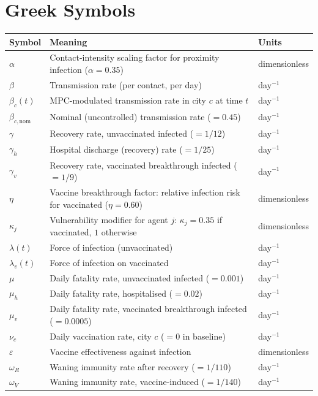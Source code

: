 \bigskip
\section*{Greek Symbols}

\begin{tabular}{@{}lll@{}}
\toprule
\textbf{Symbol} & \textbf{Meaning} & \textbf{Units} \\
\midrule
$\alpha$    & Contact-intensity scaling factor for proximity infection ($\alpha=0.35$) & dimensionless \\
$\beta$     & Transmission rate (per contact, per day)                         & day$^{-1}$ \\
$\beta_c(t)$& MPC-modulated transmission rate in city $c$ at time $t$          & day$^{-1}$ \\
$\beta_{c,\mathrm{nom}}$ & Nominal (uncontrolled) transmission rate ($=0.45$) & day$^{-1}$ \\
$\gamma$    & Recovery rate, unvaccinated infected ($=1/12$)                   & day$^{-1}$ \\
$\gamma_h$  & Hospital discharge (recovery) rate ($=1/25$)                      & day$^{-1}$ \\
$\gamma_v$  & Recovery rate, vaccinated breakthrough infected ($=1/9$)         & day$^{-1}$ \\
$\eta$      & Vaccine breakthrough factor: relative infection risk for vaccinated ($\eta=0.60$) & dimensionless \\
$\kappa_j$ & Vulnerability modifier for agent $j$: $\kappa_j=0.35$ if vaccinated, $1$ otherwise & dimensionless \\
$\lambda(t)$& Force of infection (unvaccinated)                                & day$^{-1}$ \\
$\lambda_v(t)$ & Force of infection on vaccinated                              & day$^{-1}$ \\
$\mu$       & Daily fatality rate, unvaccinated infected ($=0.001$)            & day$^{-1}$ \\
$\mu_h$     & Daily fatality rate, hospitalised ($=0.02$)                       & day$^{-1}$ \\
$\mu_v$     & Daily fatality rate, vaccinated breakthrough infected ($=0.0005$)& day$^{-1}$ \\
$\nu_c$     & Daily vaccination rate, city $c$ ($=0$ in baseline)              & day$^{-1}$ \\
$\varepsilon$ & Vaccine effectiveness against infection                        & dimensionless \\
$\omega_R$ & Waning immunity rate after recovery ($=1/110$)                   & day$^{-1}$ \\
$\omega_V$  & Waning immunity rate, vaccine-induced ($=1/140$)                 & day$^{-1}$ \\
\bottomrule
\end{tabular}

